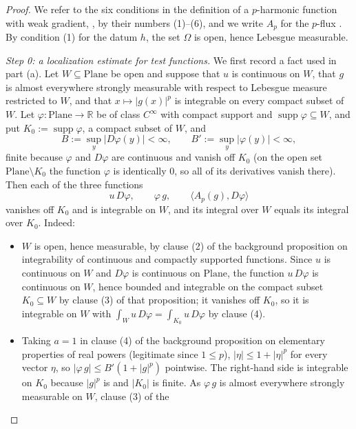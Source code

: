 \begin{proof}
We refer to the six conditions in the definition of a $p$-harmonic function with weak gradient,
, by their numbers (1)--(6), and we write $A_p$ for the $p$-flux
.  By condition (1) for the datum $h$, the set $\Omega$ is open, hence Lebesgue
measurable.

\medskip\noindent\emph{Step 0: a localization estimate for test functions.}
We first record a fact used in part (a).  Let $W\subseteq\mathrm{Plane}$ be open and suppose
that $u$ is continuous on $W$, that $g$ is almost everywhere strongly measurable with respect to
Lebesgue measure restricted to $W$, and that $x\mapsto\lvert g(x)\rvert^{p}$ is integrable on
every compact subset of $W$.  Let $\varphi\colon\mathrm{Plane}\to\mathbb{R}$ be of class
$C^\infty$ with compact support and $\operatorname{supp}\varphi\subseteq W$, and put
$K_0:=\operatorname{supp}\varphi$, a compact subset of $W$, and
\[
  B:=\sup_{y}\lvert D\varphi(y)\rvert<\infty,\qquad B':=\sup_{y}\lvert\varphi(y)\rvert<\infty,
\]
finite because $\varphi$ and $D\varphi$ are continuous and vanish off $K_0$ (on the open set
$\mathrm{Plane}\setminus K_0$ the function $\varphi$ is identically $0$, so all of its
derivatives vanish there).  Then each of the three functions
\[
  u\,D\varphi,\qquad \varphi\,g,\qquad \bigl\langle A_p(g),D\varphi\bigr\rangle
\]
vanishes off $K_0$ and is integrable on $W$, and its integral over $W$ equals its integral over
$K_0$.  Indeed:
\begin{itemize}
\item $W$ is open, hence measurable, by clause (2) of the background proposition on
integrability of continuous and compactly supported functions.  Since $u$ is continuous on $W$
and $D\varphi$ is continuous on $\mathrm{Plane}$, the function $u\,D\varphi$ is continuous on
$W$, hence bounded and integrable on the compact subset $K_0\subseteq W$ by clause (3) of that
proposition; it vanishes off $K_0$, so it is integrable on $W$ with
$\int_Wu\,D\varphi=\int_{K_0}u\,D\varphi$ by clause (4).
\item Taking $a=1$ in clause (4) of the background proposition on elementary properties of real
powers (legitimate since $1\le p$), $\lvert\eta\rvert\le1+\lvert\eta\rvert^{p}$ for every
vector $\eta$, so $\lvert\varphi\,g\rvert\le B'(1+\lvert g\rvert^{p})$ pointwise.  The
right-hand side is integrable on $K_0$ because $\lvert g\rvert^{p}$ is and $\lvert K_0\rvert$ is
finite.  As $\varphi\,g$ is almost everywhere strongly measurable on $W$, clause (3) of the

\end{itemize}
\end{proof}

